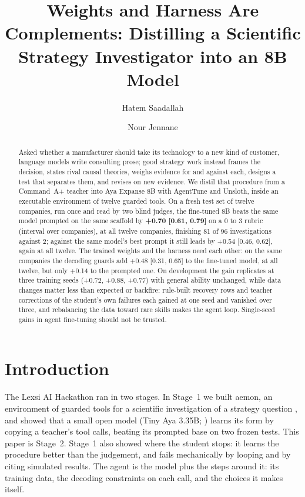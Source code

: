 \documentclass[11pt]{article}
\title{Weights and Harness Are Complements: Distilling a Scientific Strategy Investigator into an 8B Model}
\author{Hatem Saadallah \and Nour Jennane}
\begin{document}
\maketitle

\begin{abstract}
Asked whether a manufacturer should take its technology to a new kind of customer, language models write consulting
prose; good strategy work instead frames the decision, states rival causal theories, weighs evidence for and against
each, designs a test that separates them, and revises on new evidence. We distil that procedure from a Command~A+
teacher into Aya Expanse 8B with AgentTune and Unsloth, inside an executable environment of twelve guarded tools. On a
fresh test set of twelve companies, run once and read by two blind judges, the fine-tuned 8B beats the same model
prompted on the same scaffold by \textbf{+0.70 [0.61, 0.79]} on a 0 to 3 rubric (interval over companies), at all
twelve companies, finishing 81 of 96 investigations against 2; against the same model's best prompt it still leads
by +0.54 [0.46, 0.62], again at all twelve. The trained
weights and the harness need each other: on the same companies the decoding guards add +0.48 [0.31, 0.65] to the
fine-tuned model, at all twelve, but only +0.14 to the prompted one. On development the gain replicates at three training seeds (+0.72, +0.88, +0.77) with
general ability unchanged, while data changes matter less than expected or backfire: rule-built recovery rows and
teacher corrections of the student's own failures each gained at one seed and vanished over three, and rebalancing
the data toward rare skills makes the agent loop. Single-seed gains in agent fine-tuning should not be trusted.
\end{abstract}

\section{Introduction}

The Lexsi AI Hackathon ran in two stages. In Stage~1 we built aemon, an environment of guarded tools for a
scientific investigation of a strategy question \citep{camuffo2020scientific,camuffo2024theory}, and showed that a
small open model (Tiny Aya 3.35B; \citealp{cohere2026tinyaya}) learns its form by copying a teacher's tool calls, beating its prompted base on two
frozen tests. This paper is Stage~2. Stage~1 also showed where the student stops: it learns the procedure better than the
judgement, and fails mechanically by looping and by citing simulated results. The agent is the model plus the steps
around it: its training data, the decoding constraints on each call, and the choices it makes itself.
\end{document}
